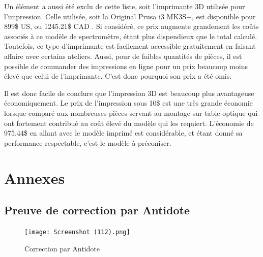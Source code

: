 \documentclass[11pt,letterpaper]{article}
\begin{document}
Un élément a aussi été exclu de cette liste, soit l'imprimante 3D utilisée pour l'impression.
Celle utilisée, soit la Original Prusa i3 MK3S+, est disponible pour 899\$ US, ou 1245.21\$ CAD \cite{prusa_imprimante_2024} .
Si considéré, ce prix augmente grandement les coûts associés à ce modèle de spectromètre, étant
plus dispendieux que le total calculé. Toutefois, ce type d'imprimante est facilement accessible
gratuitement en faisant affaire avec certains ateliers. Aussi, pour de faibles quantités de
pièces, il est possible de commander des impressions en ligne pour un prix beaucoup moins  élevé que celui de l'imprimante. C'est donc pourquoi son prix a été omis.

Il est donc facile de conclure que l'impression 3D est beaucoup plus avantageuse économiquement.
Le prix de l'impression sous 10\$ est une très grande économie lorsque comparé aux nombreuses
pièces servant au montage sur table optique qui ont fortement contribué au coût élevé du
modèle qui les requiert. L'économie de 975.44\$ en allant avec le modèle imprimé est
considérable, et étant donné sa performance respectable, c'est le modèle à préconiser.






\clearpage

\section{Annexes}

\subsection{Preuve de correction par Antidote}
\begin{figure}[H]
    \centering
    \texttt{[image: Screenshot (112).png]}
    \caption{Correction par Antidote}
\end{figure}
\end{document}
